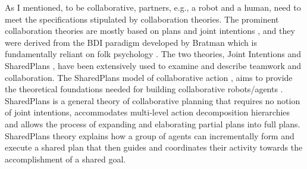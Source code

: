 \documentclass[a4paper, 11pt]{article}
\begin{document}
\begin{small}
As I mentioned, to be collaborative, partners, e.g., a robot and a human, need
to meet the specifications stipulated by collaboration theories. The prominent
collaboration theories are mostly based on plans and joint intentions
\cite{cohen:teamwork,grosz:plans-discourse,Litman:discourse-commonsense}, and
they were derived from the BDI paradigm developed by Bratman
\cite{bratman:intentions-plans} which is fundamentally reliant on folk
psychology \cite{ravenscroft:folk}. The two theories, Joint Intentions
\cite{cohen:teamwork} and SharedPlans \cite{grosz:plans-discourse}, have been
extensively used to examine and describe teamwork and collaboration. The
SharedPlans model of collaborative action \cite{grosz:planning-acting,
grosz:collaboration, grosz:plans-discourse}, aims to provide the theoretical
foundations needed for building collaborative robots/agents
\cite{grosz:collaborative-systems}. SharedPlans is a general theory of
collaborative planning that requires no notion of joint intentions, accommodates
multi-level action decomposition hierarchies and allows the process of expanding
and elaborating partial plans into full plans. SharedPlans theory explains how a
group of agents can incrementally form and execute a shared plan that then
guides and coordinates their activity towards the accomplishment of a shared
goal.



\end{small}
\end{document}
